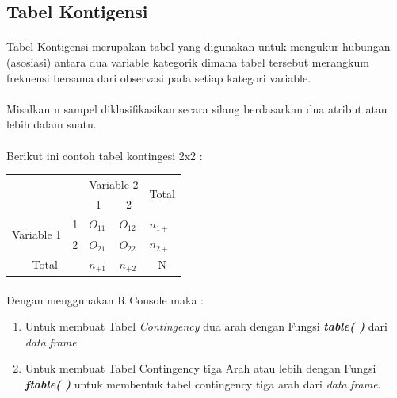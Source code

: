 \documentclass[a4paper,12pt]{article}
\begin{document}
\subsection{Tabel Kontigensi}
\paragraph{}
Tabel Kontigensi merupakan tabel yang digunakan untuk mengukur hubungan (asosiasi) antara dua variable kategorik dimana tabel tersebut merangkum frekuensi bersama dari observasi pada setiap kategori variable. 
\paragraph{}
Misalkan n sampel diklasifikasikan secara silang berdasarkan dua atribut atau lebih dalam suatu.
\paragraph{}
Berikut ini contoh tabel kontingesi 2x2 :
\begin{table}[!ht]
	\begin{tabular}{|c|c|l|l|c|}
		\hline
		\multicolumn{2}{|l|}{\multirow{2}{*}{}} & \multicolumn{2}{l|}{Variable 2}                 & \multirow{2}{*}{Total} \\ \cline{3-4}
		\multicolumn{2}{|l|}{}                  & \multicolumn{1}{c|}{1} & \multicolumn{1}{c|}{2} &                        \\ \hline
		\multirow{2}{*}{Variable 1}     & 1     & $O_{11}$                       &$O_{12}$                      &\multicolumn{1}{l|}{$n_{1+}$ }  \\ \cline{2-5} 
		& 2     & $O_{21}$                       & $O_{22}$                       & \multicolumn{1}{l|}{$n_{2+}$}  \\ \hline
		\multicolumn{2}{|c|}{Total}             & $n_{+1}$                       &  $n_{+2}$                      & N                      \\ \hline
	\end{tabular}
\end{table}
\paragraph{}
Dengan menggunakan R Console maka :
\begin{enumerate}
	\item Untuk membuat Tabel \textit{Contingency} dua arah dengan Fungsi \textit{\textbf{table( )}} dari  \textit{data.frame}
	\item Untuk membuat Tabel Contingency tiga Arah atau lebih dengan Fungsi \textit{\textbf{ftable( )}} untuk membentuk tabel contingency tiga arah dari \textit{data.frame}.
\end{enumerate}
\end{document}
